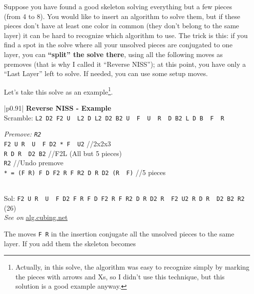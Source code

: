 \documentclass[11pt,a4paper]{book}
\newcommand{\p}{\textquotesingle}
\newcommand{\m}{\texttt}
\newcommand{\ps}{\p\,\,}
\newcommand{\comment}[1]{{\color{gray}\quad//#1}}
\begin{document}
Suppose you have found a good skeleton solving everything but a few pieces (from 4 to 8). You would like to insert an algorithm to solve them, but if these pieces don't have at least one color in common (they don't belong to the same layer) it can be hard to recognize which algorithm to use. The trick is this: if you find a spot in the solve where all your unsolved pieces are conjugated to one layer, you can \textbf{``split'' the solve there}, using all the following moves as premoves (that is why I called it ``Reverse NISS''); at this point, you have only a ``Last Layer'' left to solve. If needed, you can use some setup moves.

Let's take this solve as an example\footnote{Actually, in this solve, the algorithm was easy to recognize simply by marking the pieces with arrows and Xs, so I didn't use this technique, but this solution is a good example anyway.}.

\bigskip
\begin{tabular}{|p{}|}
\hline
\textbf{Reverse NISS - Example}\\
\hline
Scramble: \m{L2 D2 F2 U\ps L2 D L2 D2 B2 U\ps F\ps U\ps R\ps D B2 L D B\ps F\ps R\p}\\
\hline
\begin{minipage}[l]{0.650\textwidth}
\emph{Premove: \m{R2}}\\
\m{F2 U R\ps U\ps F D2 * F\ps U2} \comment{2x2x3}\\
\m{R D R\ps D2 B2} \comment{F2L (All but 5 pieces)}\\
\m{R2} \comment{Undo premove}\\
\m{* = (F R) F D F2 R F R2 D R D2 (R\ps F\p)} \comment{5 pieces}
\end{minipage}
\begin{minipage}[c]{0.25\textwidth}

\end{minipage}\\
\hline
Sol: \m{F2 U R\ps U\ps F D2 F R F D F2 R F R2 D R D2 R\ps F2 U2 R D R\ps D2 B2 R2} (26)\\
\hline
\emph{See on }\href{https://alg.cubing.net/?setup=R2_L2_D2_F2_U-_L2_D_L2_D2_B2_U-_F-_U-_R-_D_B2_L_D_B-_F-_R-&alg=\%2F\%2FPremove_added_to_the_scramble\%0AF2_U_R-_U-_F_D2_((F_R)_F_D_F2_R_F_R2_D_R_D2_(R-_F-))_F-_U2_\%2F\%2F2x2x3\%0AR_D_R-_D2_B2_\%2F\%2FF2L_(All_but_5_pieces)}{alg.cubing.net}\\
\hline
\end{tabular}
\bigskip

The moves \m{F R} in the insertion conjugate all the unsolved pieces to the same layer. If you add them the skeleton becomes
\end{document}
